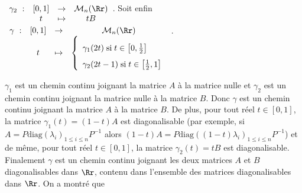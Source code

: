 {\begin{enumerate}
{$\begin{array}[t]{cccc}
\gamma_2~:&[0,1]&\rightarrow&\mathcal{M}_n(\Rr)\\
 &t&\mapsto &tB
 \end{array}$. Soit enfin $\begin{array}[t]{cccc}
\gamma~:&[0,1]&\rightarrow&\mathcal{M}_n(\Rr)\\
 &t&\mapsto &\left\{
 \begin{array}{l}
 \rule[-4mm]{0mm}{10mm}\gamma_1(2t)\;\text{si}\;t\in\left[0, \frac{1}{2}\right]\\
 \gamma_2(2t-1)\;\text{si}\;t\in\left[ \frac{1}{2},1\right]
 \end{array}
 \right.
 \end{array}$.
 
 
$\gamma_1$ est un chemin continu joignant la matrice $A$ à la matrice nulle et $\gamma_2$ est un chemin continu joignant la matrice nulle à la matrice $B$. Donc $\gamma$ est un chemin continu joignant la matrice $A$ à la matrice $B$. De plus, pour tout réel $t\in[0,1]$, la matrice $\gamma_1(t)=(1-t)A$ est diagonalisable (par exemple, si $A=P\text{diag}(\lambda_i)_{1\leqslant i\leqslant n}P^{-1}$ alors $(1-t)A=P\text{diag}((1-t)\lambda_i)_{1\leqslant i\leqslant n}P^{-1}$) et de même, pour tout réel $t\in[0,1]$, la matrice $\gamma_2(t)=tB$ est diagonalisable. Finalement $\gamma$ est un chemin continu joignant les deux matrices $A$ et $B$ diagonalisables dans $\Rr$, contenu dans l'ensemble des matrices diagonalisables dans $\Rr$. On a montré que

\begin{center}
\end{center}}
\end{enumerate}
}